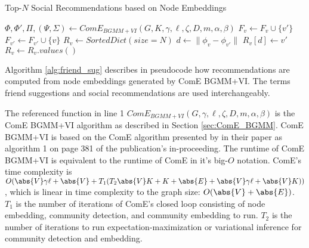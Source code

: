 \documentclass[conference]{IEEEtran}
\begin{document}
\begin{algorithm}[H]
    \caption{Top-$N$ Social Recommendations based on Node Embeddings}
    \label{alg:friend_sug}
    \begin{algorithmic}[1]
        \State $\Phi, \Phi', \Pi, (\Psi,\Sigma) \leftarrow ComE_{BGMM+VI}(G, K, \gamma, \ell, \zeta, D, m, \alpha, \beta)$ 
         
        \State $F_v \leftarrow F_v \cup \{v'\}$
        \State $F_{v'} \leftarrow F_{v'} \cup \{v\}$
        \EndFor
        \State $R_v \leftarrow SortedDict(size=N)$ 
         
        \State $d \leftarrow \|\phi_v - \phi_{v'}\|$ 
        \State $R_v[d] \leftarrow v'$ 
        \EndFor
        \State $R_v  \leftarrow R_v.values()$ 
        \EndFor
    \end{algorithmic}
\end{algorithm}

Algorithm \ref{alg:friend_sug} describes in pseudocode how recommendations are computed from node embeddings generated by ComE BGMM+VI. The terms friend suggestions and social recommendations are used interchangeably.

The referenced function in line 1 $ComE_{BGMM+VI}(G, \gamma, \ell, \zeta, D, m, \alpha, \beta)$ is the ComE BGMM+VI algorithm as described in Section \ref{sec:ComE_BGMM}. ComE BGMM+VI is based on the ComE algorithm presented by \citeauthor{ComE} in their paper  as algorithm 1 on page 381 of the publication's in-proceeding. The runtime of ComE BGMM+VI is equivalent to the runtime of ComE in it's big-$O$ notation. ComE's time complexity is $O(\abs{V}\gamma\ell + \abs{V} + T_1 (T_2\abs{V}K + K + \abs{E} + \abs{V}\gamma\ell + \abs{V}K))$, which is linear in time complexity to the graph size: $O(\abs{V} + \abs{E})$.\cite{ComE} $T_1$ is the number of iterations of ComE's closed loop consisting of node embedding, community detection, and community embedding to run. $T_2$ is the number of iterations to run expectation-maximization or variational inference for community detection and embedding.
\end{document}
